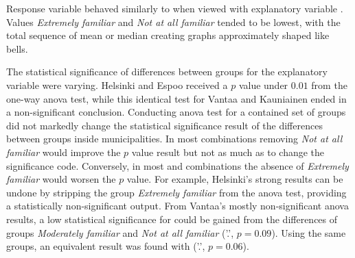 Response variable  behaved similarly to  when viewed with explanatory variable . Values \textit{Extremely familiar} and \textit{Not at all familiar} tended to be lowest, with the total sequence of mean or median creating graphs approximately shaped like bells.

The statistical significance of differences between groups for the explanatory variable  were varying. Helsinki and Espoo received a $p$ value under $0.01$ from the one-way \acrshort{anova} test, while this identical test for Vantaa and Kauniainen ended in a non-significant conclusion. Conducting \acrshort{anova} test for a contained set of  groups did not markedly change the statistical significance result of the differences between groups inside municipalities. In most combinations removing \textit{Not at all familiar} would improve the $p$ value result but not as much as to change the significance code. Conversely, in most  and  combinations the absence of \textit{Extremely familiar} would worsen the $p$ value. For example, Helsinki's strong  results can be undone by stripping the group \textit{Extremely familiar} from the \acrshort{anova} test, providing a statistically non-significant output. From Vantaa's mostly non-significant \acrshort{anova} results, a low statistical significance for  could be gained from the differences of groups \textit{Moderately familiar} and \textit{Not at all familiar} ('.', $p = 0.09$). Using the same groups, an equivalent result was found with  ('.', $p = 0.06$).

